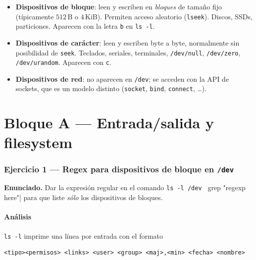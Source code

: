 \documentclass[11pt,a4paper]{article}
\begin{document}
\begin{itemize}[leftmargin=*,nosep]
    \item \textbf{Dispositivos de bloque}: leen y escriben en
        \emph{bloques} de tamaño fijo (típicamente $512$\,B o
        $4$\,KiB). Permiten acceso aleatorio (\texttt{lseek}).
        Discos, SSDs, particiones. Aparecen con la letra \texttt{b}
        en \texttt{ls -l}.
    \item \textbf{Dispositivos de carácter}: leen y escriben byte a
        byte, normalmente sin posibilidad de \texttt{seek}. Teclados,
        seriales, terminales, \texttt{/dev/null}, \texttt{/dev/zero},
        \texttt{/dev/urandom}. Aparecen con \texttt{c}.
    \item \textbf{Dispositivos de red}: no aparecen en \texttt{/dev};
        se acceden con la API de sockets, que es un modelo distinto
        (\texttt{socket}, \texttt{bind}, \texttt{connect}, \ldots).
\end{itemize}

\part*{Bloque A --- Entrada/salida y filesystem}

\section{Ejercicio 1 --- Regex para dispositivos de bloque en \texttt{/dev}}

\textbf{Enunciado.} Dar la expresión regular en el comando
\verb|ls -l /dev | grep "regexp here"| para que liste \emph{sólo} los
dispositivos de bloques.

\subsection*{Análisis}

\texttt{ls -l} imprime una línea por entrada con el formato

\begin{lstlisting}[style=textstyle]
<tipo><permisos> <links> <user> <group> <maj>,<min> <fecha> <nombre>
\end{lstlisting}
\end{document}
